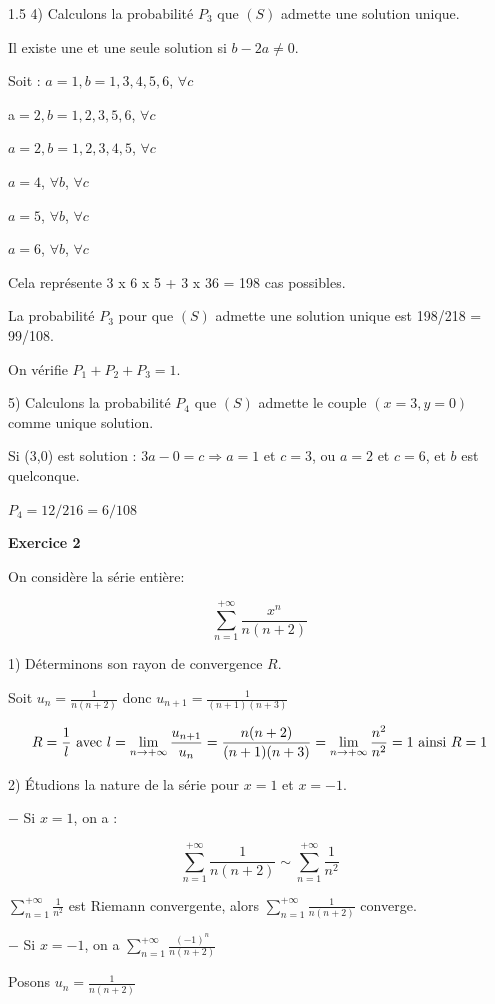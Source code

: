 \documentclass[12pt]{article}
\begin{document}
\begin{spacing}{1.5}
4) Calculons la probabilité $P_3$ que $(S)$ admette une solution unique. 

Il existe une et une seule solution si $b-2a\neq 0$. 

Soit : 
$a = 1, b = 1, 3, 4, 5, 6 $, $\forall c$
 
a$ = 2, b = 1, 2, 3, 5, 6 $, $\forall c $

$a = 2, b = 1, 2, 3, 4, 5 $, $\forall c $

$a = 4$, $\forall b$, $\forall c$ 

$a = 5$, $\forall b$, $\forall c$
 
$a = 6$, $\forall b$, $\forall c$
 
Cela représente 3 x 6 x 5 + 3 x 36 = 198 cas possibles. 

La probabilité $P_3$ pour que $(S)$ admette une solution unique est 198/218 = 99/108. 

On vérifie $P_1 + P_2 + P_3 = 1$.

5) Calculons la probabilité $P_4$ que $(S)$ admette le couple $(x = 3, y = 0)$ comme unique 
solution.

Si (3,0) est solution : $3a-0 = c 
\Rightarrow a = 1$ et $c = 3$, ou $a = 2$ et $c = 6$, et $b$ est quelconque. 

$P_4 = 12/216 = 6/108$

\medskip\textbf{Exercice 2}


On considère la série entière:

\[\sum_{n=1}^{+\infty}\frac{x^n}{n(n+2)}\]

1) Déterminons son rayon de convergence $R$.

Soit $u_n=\frac{1}{n(n+2)}$ donc $u_{n+1}=\frac{1}{(n+1)(n+3)}$

\[R=\frac{1}{l} \text{ avec } l=\lim_{n\to +\infty}\frac{u_{n+1}}{u_n}=\frac{n(n+2)}{(n+1)(n+3)}=\lim_{n\to +\infty}\frac{n^2}{n^2}=1\\
\text{ ainsi } R=1\]

2) Étudions la nature de la série pour $x=1$ et $x=-1$.

$-$ Si $x=1$, on a :

\[\sum_{n=1}^{+\infty}\frac{1}{n(n+2)}\sim\sum_{n=1}^{+\infty}\frac{1}{n^2}\]

$\sum_{n=1}^{+\infty}\frac{1}{n^2}$ est Riemann convergente, alors $\sum_{n=1}^{+\infty}\frac{1}{n(n+2)}$ converge.

\quad
$-$ Si $x=-1$, on a $\sum_{n=1}^{+\infty}\frac{(-1)^n}{n(n+2)}$

Posons $u_n=\frac{1}{n(n+2)}$


\end{spacing}
\end{document}
